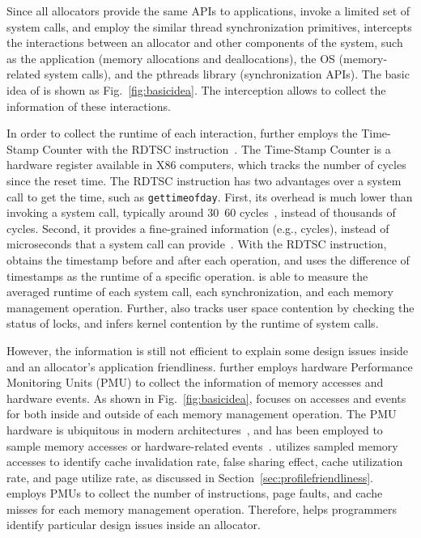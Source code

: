 Since all allocators provide the same APIs to applications, invoke a limited set of system calls, and employ the similar thread synchronization primitives, \MP{} intercepts the interactions between an allocator and other components of the system, such as the application (memory allocations and deallocations), the OS (memory-related system calls), and the pthreads library (synchronization APIs). The basic idea of \MP{} is shown as Fig.~\ref{fig:basicidea}. The interception allows \MP{} to collect the information of these interactions. 

In order to collect the runtime of each interaction, \MP{} further employs the Time-Stamp Counter with the RDTSC instruction~\cite{coorporation1997using}. The Time-Stamp Counter is a hardware register available in X86 computers, which tracks the number of cycles since the reset time. The RDTSC instruction has two advantages over a system call to get the time, such as \texttt{gettimeofday}. First, its overhead is much lower than invoking a system call, typically around 30~60  cycles~\cite{rdtscoverhead}, instead of thousands of cycles. Second, it provides a fine-grained information (e.g., cycles), instead of microseconds that a system call can provide~\cite{pitfallsrdtsc}. With the RDTSC instruction, \MP{} obtains the timestamp before and after each operation, and uses the difference of timestamps as the runtime of a specific operation. \MP{} is able to measure the averaged runtime of each system call, each synchronization, and each memory management operation. Further, \MP{} also tracks user space contention by checking the status of locks, and infers kernel contention by the runtime of system calls. 

However, the information is still not efficient to explain some design issues inside and an allocator's application friendliness. \MP{} further employs hardware Performance Monitoring Units (PMU) to collect the information of memory accesses and hardware events. As shown in Fig.~\ref{fig:basicidea}, \MP{} focuses on accesses and events for both inside and outside of each memory management operation. The PMU hardware is ubiquitous in modern architectures~\cite{AMDIBS:07, IntelArch:PEBS:Sept09, armpmu}, and has been  employed to sample memory accesses or hardware-related events~\cite{DBLP:conf/sc/ItzkowitzWAK03, ibs-sc, Sheng:2011:RLN:1985793.1985848}.
\MP{} utilizes sampled memory accesses to identify cache invalidation rate, false sharing effect, cache utilization rate, and page utilize rate, as discussed in Section~\ref{sec:profilefriendliness}. \MP{} employs PMUs to collect the number of instructions, page faults, and cache misses for each memory management operation. Therefore, \MP{} helps programmers identify particular design issues inside an allocator. 

